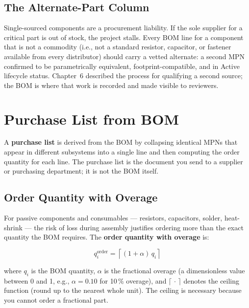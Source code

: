 \subsection{The Alternate-Part Column}
\label{sec:ch11-alternates}

Single-sourced components are a procurement liability.
If the sole supplier for a critical part is out of stock, the project stalls.
Every BOM line for a component that is not a commodity (i.e., not a standard
resistor, capacitor, or fastener available from every distributor) should carry
a vetted alternate: a second MPN confirmed to be parametrically equivalent,
footprint-compatible, and in Active lifecycle status.
Chapter~6 described the process for qualifying a second source; the BOM is
where that work is recorded and made visible to reviewers.

\section{Purchase List from BOM}
\label{sec:ch11-purchase-list}

A \textbf{purchase list} is derived from the BOM by
collapsing identical MPNs that appear in different subsystems into a single
line and then computing the order quantity for each line.
The purchase list is the document you send to a supplier or purchasing
department; it is not the BOM itself.

\subsection{Order Quantity with Overage}
\label{sec:ch11-order-qty}

For passive components and consumables --- resistors, capacitors, solder,
heat-shrink --- the risk of loss during assembly justifies ordering more than
the exact quantity the BOM requires.
The \textbf{order quantity with overage} is:

\begin{equation}\label{eq:ch11-order-qty}
  q_i^{\text{order}} = \left\lceil (1 + \alpha)\,q_i \right\rceil
\end{equation}

where $q_i$ is the BOM quantity, $\alpha$ is the fractional overage
(a dimensionless value between 0 and 1, e.g., $\alpha = 0.10$ for 10\,\%
overage), and $\lceil\,\cdot\,\rceil$ denotes the ceiling function (round up
to the nearest whole unit).
The ceiling is necessary because you cannot order a fractional part.


